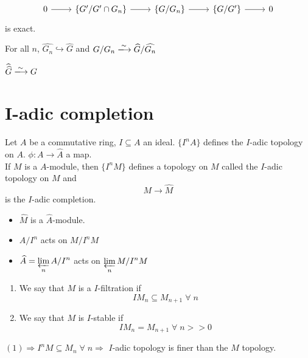 \documentclass[oneside, 12pt]{scrbook}
\newcommand{\ds}{\displaystyle}
\theoremstyle{theorem}
\begin{document}
\begin{corollary}
\[\begin{tikzcd}
	0 & {\{G'/G' \cap G_{n}\}} & {\{G/G_{n}\}} & {\{G/G'\}} & 0
	\arrow[from=1-1, to=1-2]
	\arrow[from=1-2, to=1-3]
	\arrow[from=1-3, to=1-4]
	\arrow[from=1-4, to=1-5]
\end{tikzcd}\] is exact.
\end{corollary}

\begin{corollary}
For all $n$, $\widehat{G_{n}}\hookrightarrow \widehat{G}$ and $G/G_{n} \xlongrightarrow{\sim} \widehat{G}/\widehat{G_{n}}$
\end{corollary}

\begin{corollary}
$\widehat{\widehat{G}} \xlongrightarrow{\sim} G$
\end{corollary}

\section{I-adic completion}

Let $A$ be a commutative ring, $I \subseteq A$ an ideal. $\{I^n A\}$ defines the $I$-adic topology on $A$. $\phi : A \rightarrow \widehat{A}$ a map. \\

If $M$ is a $A$-module, then $\{I^n M\}$ defines a topology on $M$ called the $I$-adic topology on $M$ and $$M \longrightarrow \widehat{M}$$ is the $I$-adic completion. 
\begin{itemize}
\item $\widehat{M}$ is a $\widehat{A}$-module.
\item $A/I^n$ acts on $M/I^nM$
\item $\widehat{A} = \ds{\varprojlim_{n} A/I^n}$ acts on $\ds{\varprojlim_{n} M/I^nM}$
\end{itemize}

\begin{definition}
\begin{enumerate}
\item We say that $M$ is a $I$-filtration if $$IM_{n} \subseteq M_{n+1} \; \forall \; n$$
\item We say that $M$ is $I$-stable if $$IM_{n} = M_{n+1} \; \forall \; n >>0$$
\end{enumerate}
\end{definition}

\begin{remark}
$(1) \Rightarrow I^n M \subseteq M_{n} \; \forall \; n \Rightarrow$ $I$-adic topology is finer than the $M$ topology.
\end{remark}
\end{document}
